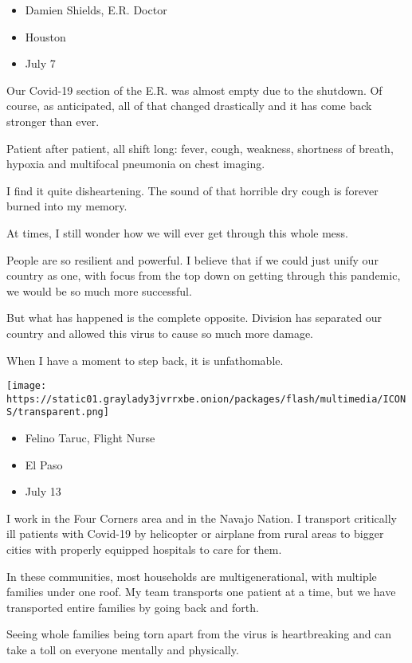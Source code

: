 \begin{itemize}
\tightlist
\item
  Damien Shields, E.R. Doctor
\item
  Houston
\item
  July 7
\end{itemize}

Our Covid-19 section of the E.R. was almost empty due to the shutdown.
Of course, as anticipated, all of that changed drastically and it has
come back stronger than ever.

Patient after patient, all shift long: fever, cough, weakness, shortness
of breath, hypoxia and multifocal pneumonia on chest imaging.

I find it quite disheartening. The sound of that horrible dry cough is
forever burned into my memory.

At times, I still wonder how we will ever get through this whole mess.

People are so resilient and powerful. I believe that if we could just
unify our country as one, with focus from the top down on getting
through this pandemic, we would be so much more successful.

But what has happened is the complete opposite. Division has separated
our country and allowed this virus to cause so much more damage.

When I have a moment to step back, it is unfathomable.

\texttt{[image: https://static01.graylady3jvrrxbe.onion/packages/flash/multimedia/ICONS/transparent.png]}

\begin{itemize}
\tightlist
\item
  Felino Taruc, Flight Nurse
\item
  El Paso
\item
  July 13
\end{itemize}

I work in the Four Corners area and in the Navajo Nation. I transport
critically ill patients with Covid-19 by helicopter or airplane from
rural areas to bigger cities with properly equipped hospitals to care
for them.

In these communities, most households are multigenerational, with
multiple families under one roof. My team transports one patient at a
time, but we have transported entire families by going back and forth.

Seeing whole families being torn apart from the virus is heartbreaking
and can take a toll on everyone mentally and physically.

